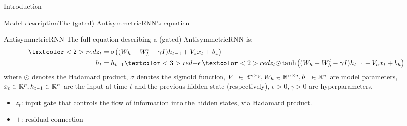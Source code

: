 \documentclass[10pt,xcolor={table,dvipsnames}]{beamer} 		%
\theoremstyle{plain}					%
\theoremstyle{definition}
\theoremstyle{remark}
\begin{document}
\begin{frame}{Introduction}
		
	\end{frame}



	\begin{frame}{Model description}{The (gated) AntisymmetricRNN's equation}
		\begin{block}{AntisymmetricRNN}
			The full equation describing a (gated) AntisymmetricRNN is:
			\[
				\begin{aligned}
					\textcolor<2>{red}{z_t} &= \sigma\qty((W_h-W_h^t-\gamma I)h_{t-1}+V_z x_t+b_z)\\
					h_t &= h_{t-1}\textcolor<3>{red}{+}\epsilon\,\textcolor<2>{red}{z_t\odot}\tanh\qty((W_h-W_h^t-\gamma I)h_{t-1}+V_h x_t+b_h)
				\end{aligned}
			\]
			where $\odot$ denotes the Hadamard product, $\sigma$ denotes the sigmoid function,
			$V_{-}\in\R{n}{p},W_h\in\R{n}{n},b_{-}\in\R{n}$ are model parameters,
			$x_t\in\R{p},h_{t-1}\in\R{n}$ are the input at time $t$ and the previous hidden state (respectively),
			$\epsilon>0,\gamma>0$ are hyperparameters.
		\end{block}
		\begin{itemize}
			\item<2-> \alert<2>{$z_t$}: input gate that controls the flow of information into the hidden states,
				via Hadamard product.
			\item<3-> \alert<3>{$+$}: residual connection
		\end{itemize}
		
	\end{frame}
\end{document}
